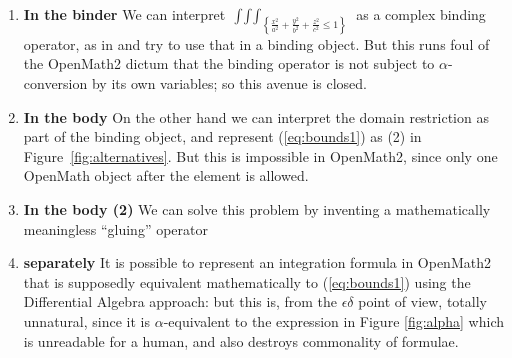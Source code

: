 \documentclass{llncs}
\begin{document}
\begin{enumerate}
\item{\textbf{In the binder}}\label{OM:bind} We can interpret
  $\scriptstyle\mathop{\int\int\int}_{\scriptscriptstyle\left\{\frac{x^2}{a^2}+\frac{y^2}{b^2}+\frac{z^2}{c^2}\le1\right\}}$
  as a complex binding operator, as in {} and try to use that in
  a binding object. But this runs foul of the OpenMath2 dictum that the binding operator
  is not subject to $\alpha$-conversion by its own variables; so this avenue is closed.
\item{\textbf{In the body}}\label{OM:multi} On the other hand we can interpret the domain
  restriction as part of the binding object, and represent (\ref{eq:bounds1}) as (2) in
  Figure~\ref{fig:alternatives}. But this is impossible in OpenMath2, since only
  one OpenMath object after the {} element is allowed.
\item{\textbf{In the body (2)}}\label{OM:wrapped} We can solve this problem by inventing a
  mathematically meaningless ``gluing'' operator
\item{\textbf{separately}}\label{OM:sep} It is possible to represent an integration
  formula in OpenMath2 that is supposedly equivalent mathematically to (\ref{eq:bounds1})
  using the Differential Algebra approach: but this is, from the $\epsilon\delta$ point of
  view, totally unnatural, since it is $\alpha$-equivalent to the expression
in Figure \ref{fig:alpha}
  which is unreadable for a human, and also destroys commonality of formulae.
\end{enumerate}
\end{document}
